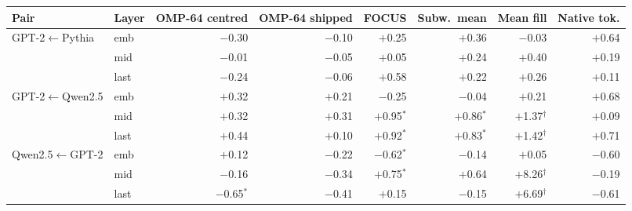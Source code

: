\begin{tabular}{llrrrrrr}
\toprule
Pair & Layer & OMP-64 centred & OMP-64 shipped & FOCUS & Subw.\ mean & Mean fill & Native tok. \\
\midrule
GPT-2$\leftarrow$Pythia & emb & $-$0.30 & $-$0.10 & $+$0.25 & $+$0.36 & $-$0.03 & $+$0.64 \\
 & mid & $-$0.01 & $-$0.05 & $+$0.05 & $+$0.24 & $+$0.40 & $+$0.19 \\
 & last & $-$0.24 & $-$0.06 & $+$0.58 & $+$0.22 & $+$0.26 & $+$0.11 \\
\midrule
GPT-2$\leftarrow$Qwen2.5 & emb & $+$0.32 & $+$0.21 & $-$0.25 & $-$0.04 & $+$0.21 & $+$0.68 \\
 & mid & $+$0.32 & $+$0.31 & $+$0.95$^{*}$ & $+$0.86$^{*}$ & $+$1.37$^{\dagger}$ & $+$0.09 \\
 & last & $+$0.44 & $+$0.10 & $+$0.92$^{*}$ & $+$0.83$^{*}$ & $+$1.42$^{\dagger}$ & $+$0.71 \\
\midrule
Qwen2.5$\leftarrow$GPT-2 & emb & $+$0.12 & $-$0.22 & $-$0.62$^{*}$ & $-$0.14 & $+$0.05 & $-$0.60 \\
 & mid & $-$0.16 & $-$0.34 & $+$0.75$^{*}$ & $+$0.64 & $+$8.26$^{\dagger}$ & $-$0.19 \\
 & last & $-$0.65$^{*}$ & $-$0.41 & $+$0.15 & $-$0.15 & $+$6.69$^{\dagger}$ & $-$0.61 \\
\bottomrule
\end{tabular}
